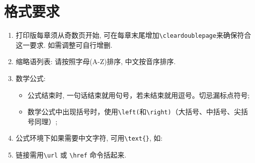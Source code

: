 \section{格式要求}
\begin{enumerate}
    \item 打印版每章须从奇数页开始, 可在每章末尾增加\verb|\cleardoublepage|来确保符合这一要求. 如需调整可自行增删.
    \item 缩略语列表: 请按照字母(A-Z)排序, 中文按音序排序.
    \item 数学公式:
        \begin{itemize}
            \item 公式结束时, 一句话结束就用句号，若未结束就用逗号。切忌漏标点符号;
            \item 数学公式中出现括号时，使用\verb|\left(|和\verb|\right)|（大括号、中括号、尖括号同理）;
        \end{itemize}
    \item 公式环境下如果需要中文字符, 可用\verb|\text{}|, 如: 

    \item 链接需用\verb|\url| 或 \verb|\href| 命令括起来.
\end{enumerate}



